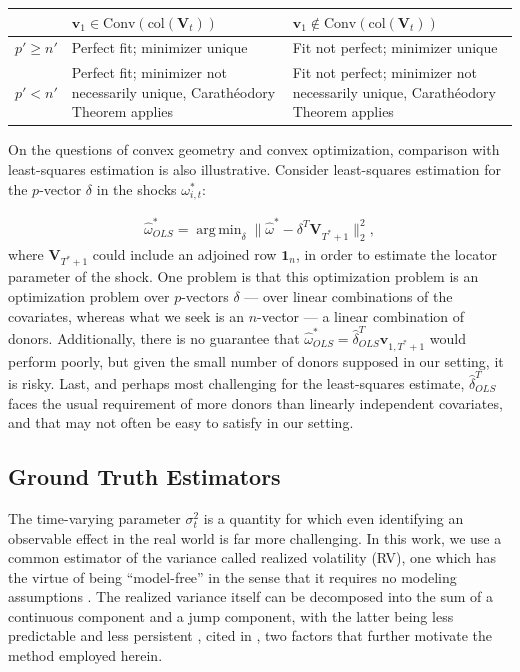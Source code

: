 \documentclass{uiucthesis2021}
\newcommand{\x}{\textbf{v}}
\newcommand{\V}{\textbf{V}}
\DeclareMathOperator*{\argmin}{arg\,min} %
\theoremstyle{definition}
\begin{document}
    \begin{center}
      \begin{tabular}{ | m{3em} | m{7cm}| m{7cm} | }
        \hline
        & $\textbf{v}_{1}\in \text{Conv}(\text{col}(\V_{t}))$ & $\textbf{v}_{1} \notin \text{Conv}(\text{col}(\V_{t}))$\\ 
        \hline
        $p' \geq n'$ & Perfect fit; minimizer unique & Fit not perfect; minimizer unique \\
        \hline
        $p' < n'$ & Perfect fit; minimizer not necessarily unique, Carath\'eodory Theorem applies& Fit not perfect; minimizer not necessarily unique, Carath\'eodory Theorem applies \\ 
        \hline
      \end{tabular}
      \end{center}
      


On the questions of convex geometry and convex optimization, comparison with least-squares estimation is also illustrative.  Consider least-squares estimation for the $p$-vector $\delta$ in the shocks $\omega^{*}_{i,t}$:

\begin{align*}
 \hat\omega^{*}_{OLS} =\argmin_{\delta}\|\hat{\omega}^{*} - \delta^{T}\textbf{V}_{T^{*}+1}\|^{2}_{2},
\end{align*}
where $\textbf{V}_{T^{*}+1}$ could include an adjoined row $\textbf{1}_{n}$, in order to estimate the locator parameter of the shock.  One problem is that this optimization problem is an optimization problem over $p$-vectors $\delta$ --- over linear combinations of the covariates, whereas what we seek is an $n$-vector --- a linear combination of donors.  Additionally, there is no guarantee that $\hat\omega^{*}_{OLS} = \hat{\delta}_{OLS}^{T}\x_{1,T^{*}+1}$ would perform poorly, but given the small number of donors supposed in our setting, it is risky.  Last, and perhaps most challenging for the least-squares estimate, $\hat{\delta}_{OLS}^{T}$ faces the usual requirement of more donors than linearly independent covariates, and that may not often be easy to satisfy in our setting.

\subsection{Ground Truth Estimators}
    \label{Ground Truth Estimators}
    
    The time-varying parameter $\sigma^{2}_{t}$ is a quantity for which even identifying an observable effect in the real world is far more challenging.  In this work, we use a common estimator of the variance called realized volatility (RV), one which has the virtue of being ``model-free'' in the sense that it requires no modeling assumptions \cite[][]{andersen2010stochastic}.  The realized variance itself can be decomposed into the sum of a continuous component and a jump component, with the latter being less predictable and less persistent \cite[][]{andersen2007roughing}, cited in \cite[][]{de2006forecasting}, two factors that further motivate the method employed herein.
    
\end{document}
